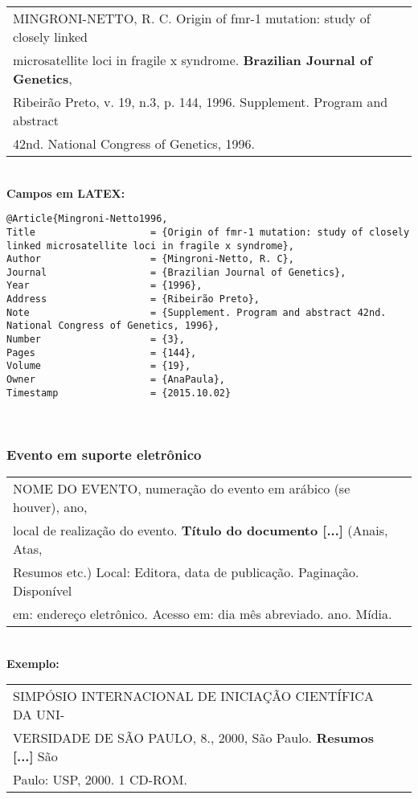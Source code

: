 \begin{tabular}{|l|c|} \hline
	MINGRONI-NETTO, R. C. Origin of fmr-1 mutation: study of closely linked \\microsatellite loci in fragile x syndrome. \textbf{Brazilian Journal of Genetics}, \\Ribeirão Preto, v. 19, n.3, p. 144, 1996. Supplement. Program and abstract \\42nd. National Congress of Genetics, 1996. 
	\\\hline
\end{tabular} \\

\textbf{Campos em LATEX:} 

\begin{verbatim}
@Article{Mingroni-Netto1996,
Title                    = {Origin of fmr-1 mutation: study of closely 
linked microsatellite loci in fragile x syndrome},
Author                   = {Mingroni-Netto, R. C},
Journal                  = {Brazilian Journal of Genetics},
Year                     = {1996},
Address                  = {Ribeirão Preto},
Note                     = {Supplement. Program and abstract 42nd. 
National Congress of Genetics, 1996},
Number                   = {3},
Pages                    = {144},
Volume                   = {19},
Owner                    = {AnaPaula},
Timestamp                = {2015.10.02}
\end{verbatim} \\

\subsubsection{Evento em suporte eletrônico} 

\begin{tabular}{|l|c|} \hline
	NOME DO EVENTO, numeração do evento em ar\'abico (se
	houver), ano, \\local de realização do evento. \textbf{Título do
		documento [...]} (Anais, Atas, \\Resumos etc.)  Local: Editora, data de publicação. Paginação. Disponível \\ em: endereço eletrônico. Acesso em: dia m\^es abreviado. ano. Mídia.
	\\\hline
\end{tabular} \\

\textbf{Exemplo:} \\

\begin{tabular}{|l|c|} \hline
	SIMPÓSIO INTERNACIONAL DE INICIAÇÃO CIENTÍFICA DA
	UNI-\\VERSIDADE DE SÃO PAULO, 8., 2000, São Paulo. \textbf{Resumos [...]}
	São \\ Paulo: USP, 2000. 1 CD-ROM.  \\\hline
\end{tabular} \\

